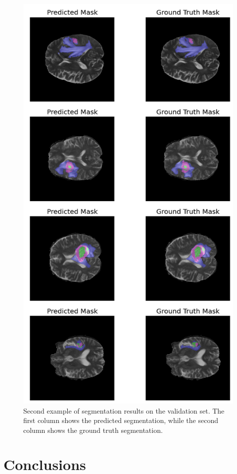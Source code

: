 \documentclass[10pt,twocolumn,letterpaper]{article}
\begin{document}
\begin{figure} 
\centering
\includegraphics[width=0.8\linewidth]{img/row-2-column-1.png}
\caption{Second example of segmentation results on the validation set. The first column shows the predicted segmentation, while the second column shows the ground truth segmentation.}
\label{fig:row-2-column-1}
\end{figure}
\section{Conclusions}
\end{document}
